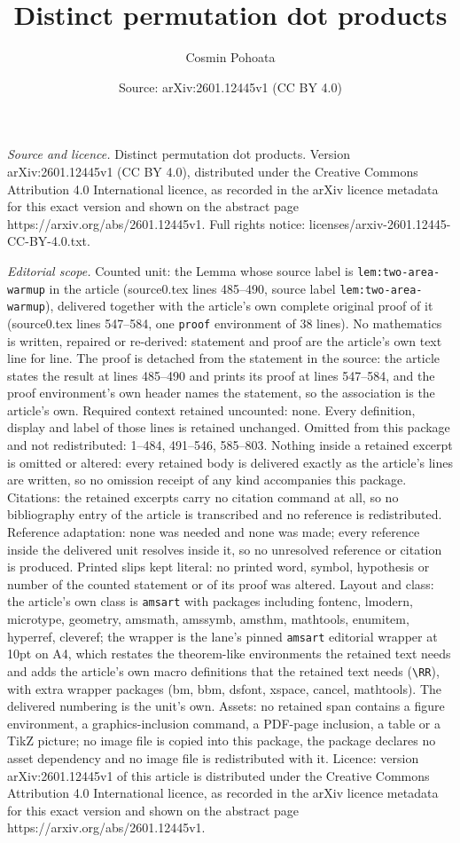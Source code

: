 \documentclass[10pt,a4paper]{amsart}
\title[Distinct permutation dot products]{Distinct permutation dot products}
\author{Cosmin Pohoata}
\date{Source: arXiv:2601.12445v1 (CC BY 4.0)}
\begin{document}
\maketitle

\noindent\emph{Source and licence.} Distinct permutation dot products. Version arXiv:2601.12445v1 (CC BY 4.0), distributed under the Creative Commons Attribution 4.0 International licence, as recorded in the arXiv licence metadata for this exact version and shown on the abstract page https://arxiv.org/abs/2601.12445v1. Full rights notice: licenses/arxiv-2601.12445-CC-BY-4.0.txt.\par\smallskip

\noindent\textit{Editorial scope.} Counted unit: the Lemma whose source label is \texttt{lem:two-area-warmup} in the article (source0.tex lines 485--490, source label \texttt{lem:two-area-warmup}), delivered together with the article's own complete original proof of it (source0.tex lines 547--584, one \texttt{proof} environment of 38 lines). No mathematics is written, repaired or re-derived: statement and proof are the article's own text line for line. The proof is detached from the statement in the source: the article states the result at lines 485--490 and prints its proof at lines 547--584, and the proof environment's own header names the statement, so the association is the article's own. Required context retained uncounted: none. Every definition, display and label of those lines is retained unchanged. Omitted from this package and not redistributed: 1--484, 491--546, 585--803. Nothing inside a retained excerpt is omitted or altered: every retained body is delivered exactly as the article's lines are written, so no omission receipt of any kind accompanies this package. Citations: the retained excerpts carry no citation command at all, so no bibliography entry of the article is transcribed and no reference is redistributed. Reference adaptation: none was needed and none was made; every reference inside the delivered unit resolves inside it, so no unresolved reference or citation is produced. Printed slips kept literal: no printed word, symbol, hypothesis or number of the counted statement or of its proof was altered. Layout and class: the article's own class is \texttt{amsart} with packages including fontenc, lmodern, microtype, geometry, amsmath, amssymb, amsthm, mathtools, enumitem, hyperref, cleveref; the wrapper is the lane's pinned \texttt{amsart} editorial wrapper at 10pt on A4, which restates the theorem-like environments the retained text needs and adds the article's own macro definitions that the retained text needs (\texttt{\textbackslash RR}), with extra wrapper packages (bm, bbm, dsfont, xspace, cancel, mathtools). The delivered numbering is the unit's own. Assets: no retained span contains a figure environment, a graphics-inclusion command, a PDF-page inclusion, a table or a TikZ picture; no image file is copied into this package, the package declares no asset dependency and no image file is redistributed with it. Licence: version arXiv:2601.12445v1 of this article is distributed under the Creative Commons Attribution 4.0 International licence, as recorded in the arXiv licence metadata for this exact version and shown on the abstract page https://arxiv.org/abs/2601.12445v1. 
\end{document}
